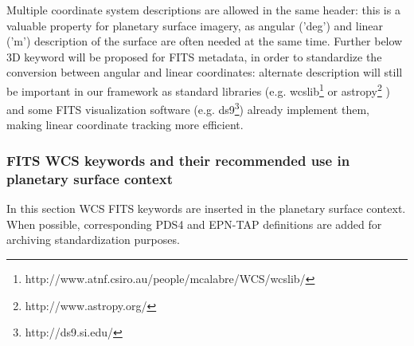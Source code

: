 Multiple coordinate system descriptions are allowed in the same header: this is a valuable
property for planetary surface imagery, as angular ('deg') and linear ('m') description of
the surface are often needed at the same time.
Further below 3D keyword will be proposed for FITS metadata, in order to standardize
the conversion between angular and linear coordinates: alternate description will still
be important in our framework as standard libraries (e.g.
wcslib\footnote{http://www.atnf.csiro.au/people/mcalabre/WCS/wcslib/} or
astropy\footnote{http://www.astropy.org/} \citet{astropy}) and some FITS visualization
software (e.g. ds9\footnote{http://ds9.si.edu/}) already implement them, making linear
coordinate tracking more efficient.  

\subsubsection{FITS WCS keywords and their recommended use in planetary surface context}
\label{sssec:wcskeys}
In this section WCS FITS keywords are inserted in the planetary surface context.
When possible, corresponding PDS4 and EPN-TAP definitions are added for archiving
standardization purposes.
